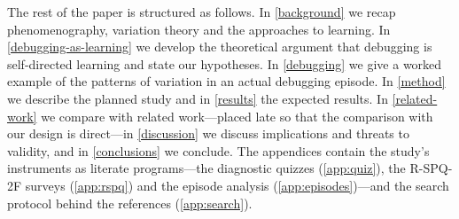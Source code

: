 
The rest of the paper is structured as follows.
In \cref{background} we recap phenomenography, variation theory and the
approaches to learning.
In \cref{debugging-as-learning} we develop the theoretical argument that
debugging is self-directed learning and state our hypotheses.
In \cref{debugging} we give a worked example of the patterns of variation in
an actual debugging episode.
In \cref{method} we describe the planned study and in \cref{results} the
expected results.
In \cref{related-work} we compare with related work---placed late so that
the comparison with our design is direct---in \cref{discussion} we discuss
implications and threats to validity, and in \cref{conclusions} we
conclude.
The appendices contain the study's instruments as literate programs---the
diagnostic quizzes (\cref{app:quiz}), the R-SPQ-2F surveys
(\cref{app:rspq}) and the episode analysis
(\cref{app:episodes})---and the search protocol behind the references
(\cref{app:search}).
